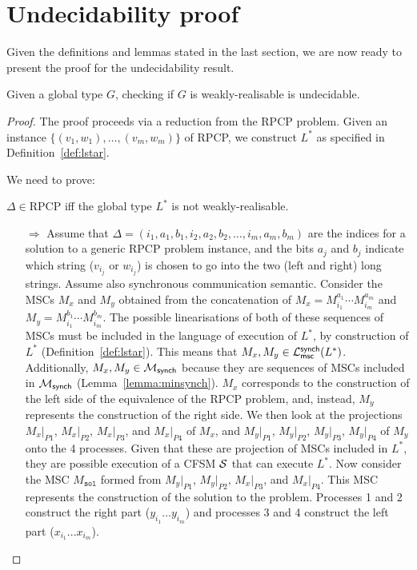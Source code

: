 \newpage

\section{Undecidability proof}

Given the definitions and lemmas stated in the last section, we are now ready
to present the proof for the undecidability result.

\bigskip

\begin{theorem}\label{thm:main}
	Given a global type $G$, checking if $G$ is weakly-realisable is undecidable.
\end{theorem}

\begin{proof}
	The proof proceeds via a reduction from the RPCP problem.
	Given an instance $\{(v_1, w_1), \ldots, (v_m, w_m)\}$ of RPCP, we
	construct $L^*$ as specified in Definition~\ref{def:lstar}.
	
	We need to prove:
	\begin{center}
		$\Delta \in \text{RPCP}$ iff the global type $L^*$ is not weakly-realisable.
	\end{center}

	\begin{itemize}
		\item[$\Rightarrow$]
			Assume that
			$\Delta = (i_1, a_1, b_1, i_2, a_2, b_2, \ldots, i_m, a_m, b_m)$ are the indices
			for a solution to a generic RPCP problem instance, and the bits $a_j$ and
			$b_j$ indicate which string ($v_{i_j}$ or $w_{i_j}$) is chosen to go into
			the two (left and right) long strings. Assume also synchronous communication semantic.
			Consider the MSCs $M_x$ and $M_y$ obtained from the concatenation of
			$M_x = M^{a_1}_{i_1} \cdots M^{a_m}_{i_m}$ 
			and $M_y = M^{b_1}_{i_1} \cdots M^{b_m}_{i_m}$.
			The possible linearisations of both of these sequences of MSCs 
			must be included in the language of execution of $L^*$, by construction 
			of $L^*$ (Definition~\ref{def:lstar}). 
			This means that $M_x, M_y \in \mathcal{L}_{\mathsf{msc}}^{\mathsf{synch}}(L^*)$.
			Additionally, $M_x,M_y\in \mathcal{M}_{\mathsf{synch}}$
			because they are sequences of MSCs included in
			$\mathcal{M}_{\mathsf{synch}}$ (Lemma~\ref{lemma:minsynch}).
			$M_x$ corresponds to the construction of the left side of the equivalence of the RPCP
			problem, and, instead, $M_y$ represents the construction of the right side.
			We then look at the projections $M_x|_{P1}$, $M_x|_{P2}$, $M_x|_{P3}$,
			and $M_x|_{P4}$ of $M_x$, and $M_y|_{P1}$, $M_y|_{P2}$, $M_y|_{P3}$, $M_y|_{P4}$ of $M_y$ onto the
			4 processes.
			Given that these are projection of MSCs included in $L^*$,
			they are possible execution of a CFSM $\mathcal{S}$ that can execute $L^*$.
			Now consider the MSC $M_{\texttt{sol}}$ 
			formed from $M_y|_{P1}$, $M_y|_{P2}$, $M_x|_{P3}$, and $M_x|_{P4}$.
			This MSC represents the construction of the solution to
			the problem. Processes 1 and 2 construct the right part ($y_{i_1}...y_{i_m}$)
			and processes 3 and 4 construct the left part ($x_{i_1}...x_{i_m}$).


\end{itemize}
\end{proof}
